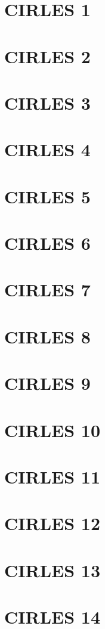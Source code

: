 \documentclass[11pt,a4paper]{article}
\begin{document}
\section{CIRLES  1}

\section{CIRLES  2}

\section{CIRLES  3}

\section{CIRLES  4}

\section{CIRLES  5}

\section{CIRLES  6}

\section{CIRLES  7}

\section{CIRLES  8}

\section{CIRLES  9}

\section{CIRLES 10}

\section{CIRLES 11}

\section{CIRLES 12}

\section{CIRLES 13}

\section{CIRLES 14}
\end{document}
